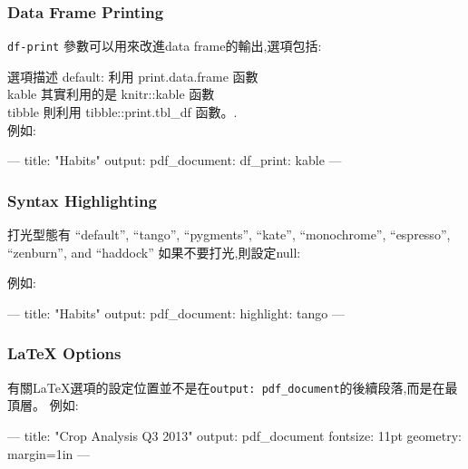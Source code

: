\documentclass[]{book}
\newenvironment{Shaded}{\begin{snugshade}}{\end{snugshade}}
\newcommand{\AttributeTok}[1]{\textcolor[rgb]{0.77,0.63,0.00}{#1}}
\newcommand{\FunctionTok}[1]{\textcolor[rgb]{0.00,0.00,0.00}{#1}}
\newcommand{\OtherTok}[1]{\textcolor[rgb]{0.56,0.35,0.01}{#1}}
\newcommand{\StringTok}[1]{\textcolor[rgb]{0.31,0.60,0.02}{#1}}
\theoremstyle{definition}
\theoremstyle{definition}
\theoremstyle{definition}
\theoremstyle{remark}
\begin{document}
\hypertarget{data-frame-printing}{%
\subsubsection{Data Frame Printing}\label{data-frame-printing}}

\texttt{df-print} 參數可以用來改進data frame的輸出,選項包括:

選項描述 default: 利用 print.data.frame 函數\\
kable 其實利用的是 knitr::kable 函數\\
tibble 則利用 tibble::print.tbl\_df 函數。.\\
例如:

\begin{Shaded}
\begin{Highlighting}[]
\OtherTok{---}
\FunctionTok{title:}\AttributeTok{ }\StringTok{"Habits"}
\FunctionTok{output:}
  \FunctionTok{pdf_document:}
    \FunctionTok{df_print:}\AttributeTok{ kable}
\OtherTok{---}
\end{Highlighting}
\end{Shaded}

\hypertarget{syntax-highlighting}{%
\subsubsection{Syntax Highlighting}\label{syntax-highlighting}}

打光型態有 ``default'', ``tango'', ``pygments'', ``kate'',
``monochrome'', ``espresso'', ``zenburn'', and ``haddock''
如果不要打光,則設定null:

例如:

\begin{Shaded}
\begin{Highlighting}[]
\OtherTok{---}
\FunctionTok{title:}\AttributeTok{ }\StringTok{"Habits"}
\FunctionTok{output:}
  \FunctionTok{pdf_document:}
    \FunctionTok{highlight:}\AttributeTok{ tango}
\OtherTok{---}
\end{Highlighting}
\end{Shaded}

\hypertarget{latex-options}{%
\subsubsection{LaTeX Options}\label{latex-options}}

有關LaTeX選項的設定位置並不是在\texttt{output:\ pdf\_document}的後續段落,而是在最頂層。
例如:

\begin{Shaded}
\begin{Highlighting}[]
\OtherTok{---}
\FunctionTok{title:}\AttributeTok{ }\StringTok{"Crop Analysis Q3 2013"}
\FunctionTok{output:}\AttributeTok{ pdf_document}
\FunctionTok{fontsize:}\AttributeTok{ 11pt}
\FunctionTok{geometry:}\AttributeTok{ margin=1in}
\OtherTok{---}
\end{Highlighting}
\end{Shaded}
\end{document}
